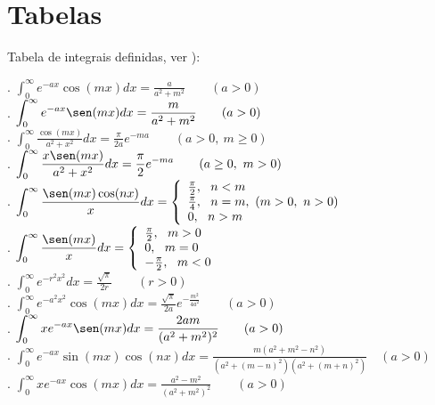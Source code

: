 
\chapter{Tabelas}
\label{tab_int_def}Tabela de integrais definidas, ver \cite{DWIGHT}):

. $\displaystyle \int_0^\infty e^{-ax}\cos(mx)dx=\frac{a}{a^2+m^2}\qquad (a>0) $\\
. $\displaystyle  \int_0^\infty e^{-ax}\sen(mx)dx=\frac{m}{a^2+m^2}\qquad (a>0) $ \\
. $\displaystyle \int_0^\infty \frac{\cos(mx)}{a^2+x^2}dx=\frac{\pi}{2a}e^{-ma}\qquad (a>0,\ m\geq 0) $\\
. $\displaystyle \int_0^\infty \frac{x\sen(mx)}{a^2+x^2}dx=\frac{\pi}{2}e^{-ma}\qquad (a\geq0,\ m> 0) $ \\
. $\displaystyle \int_0^\infty \frac{\sen(mx)\cos(nx)}{x}dx=\left\{\begin{array}{l}\frac{\pi }{2},\ \ n<m\\\frac{\pi }{4},\ \ n=m,\  (m>0, ~n>0)\\ 0,\ \ n>m \end{array}\right. $\\
. $\displaystyle \int_0^\infty \frac{\sen(mx)}{x}dx=\left\{\begin{array}{l}\frac{\pi }{2},\ \ m>0\\ 0,\ \ m=0\\-\frac{\pi }{2},\ \ m<0 \end{array}\right. $ \\
. $\displaystyle \int_0^\infty e^{-r^2x^2}dx=\frac{\sqrt{\pi}}{2r}\qquad (r>0) $\\
. $\displaystyle \int_0^\infty e^{-a^2x^2}\cos(mx)dx=\frac{\sqrt{\pi}}{2a}e^{-\frac{m^2}{4a^2}}\qquad (a>0) $ \\
. $\displaystyle \int_0^\infty xe^{-ax}\sen(mx)dx=\frac{2am}{(a^2+m^2)^2}\qquad (a>0) $\\
. $\displaystyle \int_0^\infty e^{-ax}\sin(mx)\cos(nx)dx =\frac{m(a^2+m^2-n^2)}{(a^2+(m-n)^2)(a^2+(m+n)^2)}\quad (a>0) $\\
. $\displaystyle \int_0^\infty xe^{-ax}\cos(mx)dx=\frac{a^2-m^2}{(a^2+m^2)^2}\qquad (a>0) $\\
